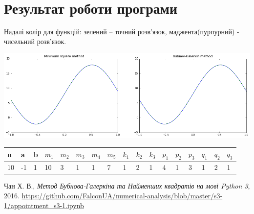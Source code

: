 \section{Результат роботи програми}

Надалі колір для функцій: зелений -- точний розв'язок, маджента(пурпурний) - чисельний розв'язок.

\bigskip

\includegraphics[width=1\linewidth]{res.png}

\begin{center}
    \begin{tabular}{| l | l | l | l | l | l | l | l | l | l | l | l | l | l | l | l | l |}
	\hline
	n & a & b & $m_1$ & $m_2$ & $m_3$ & $m_4$ & $m_5$ & $k_1$ & $k_2$ & $k_3$ & $p_1$ & $p_2$ & $p_3$ & $q_1$ & $q_2$ & $q_3$ \\ \hline
	10 & -1 & 1 & 10 & 3 & 1 & 1 & 7 & 1 & 2 & 1 & 4 & 1 & 3 & 1 & 2 & 1 \\ \hline
    \end{tabular}
\end{center}

\begin{thebibliography}{2}
  Чан Х. В., \emph{Метод Бубнова-Галеркіна та Найменших квадратів на мові Python 3}, 2016. 
  \url{https://github.com/FalconUA/numerical-analysis/blob/master/s3-1/appointment_s3-1.ipynb}
\end{thebibliography}

